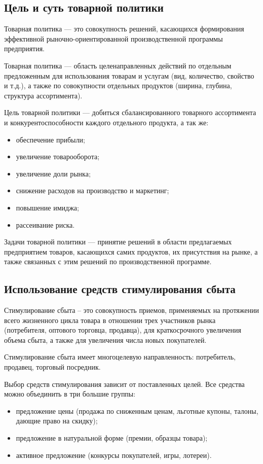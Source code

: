 \documentclass[a4paper,12pt,oneside,final]{extarticle}
\numberwithin{equation}{section}
\begin{document}
\subsection{Цель и суть товарной политики}
Товарная политика --- это совокупность решений, касающихся формирования эффективной рыночно-ориентированной производственной программы предприятия.

Товарная политика ­­--- область целенаправленных действий по отдельным предложенным для использования товарам и услугам (вид, количество, свойство и т.д.), а также по совокупности отдельных продуктов (ширина, глубина, структура ассортимента).

Цель товарной политики --- добиться сбалансированного товарного ассортимента и конкурентоспособности каждого отдельного продукта, а так же:
\begin{itemize}
	\item обеспечение прибыли;
	\item увеличение товарооборота;
	\item увеличение доли рынка;
	\item снижение расходов на производство и маркетинг;
	\item повышение имиджа;
	\item рассеивание риска.
\end{itemize}

Задачи товарной политики --- принятие решений в области предлагаемых предприятием товаров, касающихся самих продуктов, их присутствия на рынке, а также связанных с этим решений по производственной программе.

\subsection{Использование средств стимулирования сбыта}
Стимулирование сбыта – это совокупность приемов, применяемых на протяжении всего жизненного цикла товара в отношении трех участников рынка (потребителя, оптового торговца, продавца), для краткосрочного увеличения объема сбыта, а также для увеличения числа новых покупателей.

Стимулирование сбыта имеет многоцелевую направленность: потребитель, продавец, торговый посредник.

Выбор средств стимулирования зависит от поставленных целей. 
Все средства можно объединить в три большие группы:
\begin{itemize}
	\item предложение цены (продажа по сниженным ценам, льготные купоны, талоны, дающие право на скидку);
	\item предложение в натуральной форме (премии, образцы товара);
	\item активное предложение (конкурсы покупателей, игры, лотереи).
\end{itemize}
\end{document}

